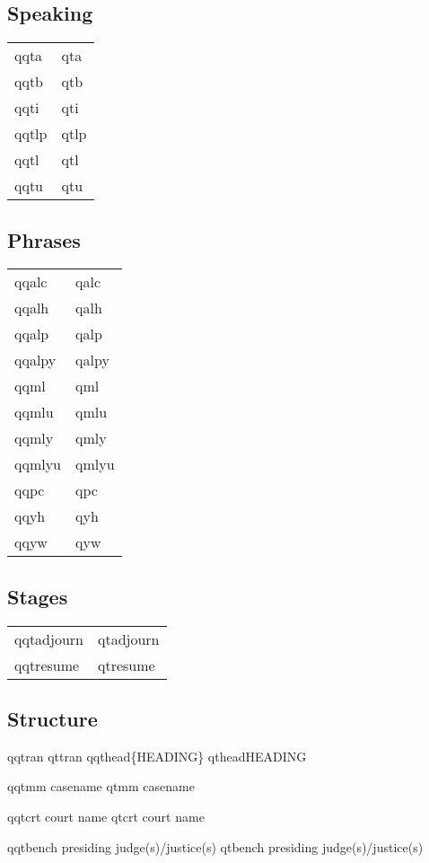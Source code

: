 \documentclass{article}
\begin{document}
\newpage
\subsection{Speaking}
\begin{tabular}{ll}
qqta & qta \\ 
qqtb & qtb \\ 
qqti & qti \\ 
qqtlp & qtlp \\
qqtl & qtl \\ 
qqtu & qtu \\ 
\end{tabular}



\newpage
\subsection{Phrases}
\begin{tabular}{ll}
qqalc & qalc \\ 
qqalh & qalh \\ 
qqalp & qalp \\ 
qqalpy & qalpy \\ 
qqml & qml \\ 
qqmlu & qmlu \\
qqmly & qmly \\ 
qqmlyu & qmlyu \\ 
qqpc & qpc \\ 
qqyh & qyh \\ 
qqyw & qyw \\ 
\end{tabular}

\newpage
\subsection{Stages}
\begin{tabular}{ll}
qqtadjourn & qtadjourn \\
qqtresume & qtresume \\ 
\end{tabular}

\newpage
\subsection{Structure}
qqtran qttran
qqthead\{HEADING\} qthead{HEADING}

qqtmm casename
qtmm casename

qqtcrt court name
qtcrt court name

qqtbench presiding judge(s)/justice(s)
qtbench presiding judge(s)/justice(s)
\end{document}
